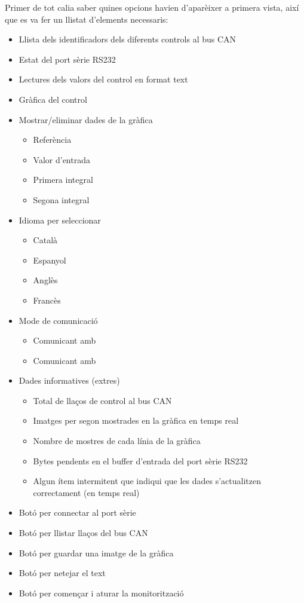 Primer de tot calia saber quines opcions havien d'aparèixer a primera vista, així que es va fer un llistat d'elements necessaris:

\begin{itemize}
	\item Llista dels identificadors dels diferents controls al bus CAN
	\item Estat del port sèrie RS232
	\item Lectures dels valors del control en format text
	\item Gràfica del control
	\item Mostrar/eliminar dades de la gràfica
		\begin{itemize}
			\item Referència
			\item Valor d'entrada
			\item Primera integral
			\item Segona integral
		\end{itemize}
	\item Idioma per seleccionar
		\begin{itemize}
			\item Català
			\item Espanyol
			\item Anglès
			\item Francès
		\end{itemize}
	\item Mode de comunicació
		\begin{itemize}
			\item Comunicant amb \SensorActuador
			\item Comunicant amb \Monitor
		\end{itemize}
	\item Dades informatives (extres)
		\begin{itemize}
			\item Total de llaços de control al bus CAN
			\item Imatges per segon mostrades en la gràfica en temps real
			\item Nombre de mostres de cada línia de la gràfica
			\item Bytes pendents en el buffer d'entrada del port sèrie RS232
			\item Algun ítem intermitent que indiqui que les dades s'actualitzen correctament (en temps real)
		\end{itemize}
	\item Botó per connectar al port sèrie
	\item Botó per llistar llaços del bus CAN
	\item Botó per guardar una imatge de la gràfica
	\item Botó per netejar el text
	\item Botó per començar i aturar la monitorització
\end{itemize}

